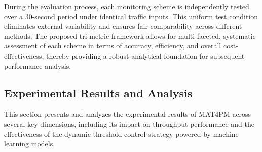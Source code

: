 During the evaluation process, each monitoring scheme is independently tested over a 30-second period under identical traffic inputs. 
This uniform test condition eliminates external variability and ensures fair comparability across different methods. 
The proposed tri-metric framework allows for multi-faceted, systematic assessment of each scheme in terms of accuracy, efficiency, and overall cost-effectiveness, thereby providing a robust analytical foundation for subsequent performance analysis.

\subsection{Experimental Results and Analysis}

\noindent This section presents and analyzes the experimental results of MAT4PM across several key dimensions, including its impact on throughput performance and the effectiveness of the dynamic threshold control strategy powered by machine learning models. 

